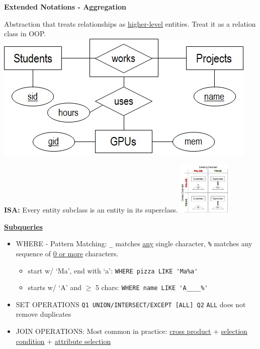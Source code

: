 \documentclass[10pt,landscape]{article}
\begin{document}
\begin{multicols*}{3}
\textbf{Extended Notations - Aggregation}
\begin{multicols*}{2}
    Abstraction that treats relationships as \underline{higher-level} entities.
    Treat it as a relation class in OOP.
\includegraphics*[scale=0.25]{images/aggregation.jpg}
\end{multicols*}
\begin{multicols*}{2}
\textbf{ISA:} Every entity subclass is an entity in its superclass.
\includegraphics*[width=2.5cm]{images/isaconstraints.jpg}
\end{multicols*}

\textbf{\underline{Subqueries}}
\begin{itemize}[topsep=0pt,noitemsep,wide=0pt, leftmargin=\dimexpr{} + 2\relax]
    \item WHERE - Pattern Matching: \verb|_| matches \underline{any} single character, \verb|%| matches any sequence of \underline{0 or more} characters.
    \begin{itemize}[topsep=0pt,noitemsep,wide=0pt, leftmargin=\dimexpr{} + 2\relax]
        \item start w/ `Ma', end with `a': \verb|WHERE pizza LIKE 'Ma%a'|
        \item starts w/ ‘A’ and $\geq$ 5 chars: \verb|WHERE name LIKE 'A____%'|
    \end{itemize}
    \item SET OPERATIONS \verb|Q1 UNION/INTERSECT/EXCEPT [ALL] Q2| \verb|ALL| does not remove duplicates
    \item JOIN OPERATIONS: Most common in practice: \underline{cross product} + \underline{selection condition} + \underline{attribute selection}
\end{itemize}


\end{multicols*}
\end{document}
